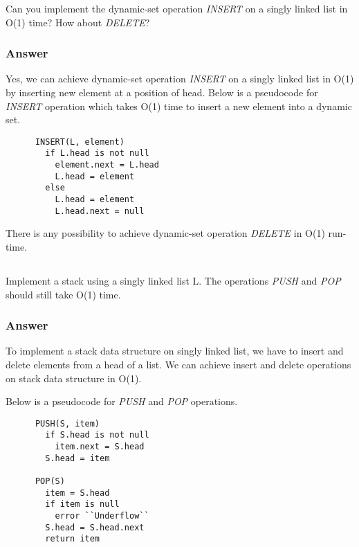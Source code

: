     Can you implement the dynamic-set operation \textit{INSERT} on a singly
    linked list in O(1) time? How about \textit{DELETE}?

    \subsubsection{Answer}

    Yes, we can achieve dynamic-set operation \textit{INSERT} on a singly
    linked list in O(1) by inserting new element at a position of head. Below
    is a pseudocode for \textit{INSERT} operation which takes O(1) time to
    insert a new element into a dynamic set.

    \begin{verbatim}
      INSERT(L, element)
        if L.head is not null
          element.next = L.head
          L.head = element
        else
          L.head = element
          L.head.next = null
    \end{verbatim}

    There is any possibility to achieve dynamic-set operation \textit{DELETE}
    in O(1) run-time.

    \subsection{}

    Implement a stack using a singly linked list L. The operations
    \textit{PUSH} and \textit{POP} should still take O(1) time.

    \subsubsection{Answer}

    To implement a stack data structure on singly linked list, we have to
    insert and delete elements from a head of a list. We can achieve insert and
    delete operations on stack data structure in O(1).

    Below is a pseudocode for \textit{PUSH} and \textit{POP} operations.

    \begin{verbatim}
      PUSH(S, item)
        if S.head is not null
          item.next = S.head
        S.head = item

      POP(S)
        item = S.head
        if item is null
          error ``Underflow``
        S.head = S.head.next
        return item
    \end{verbatim}

